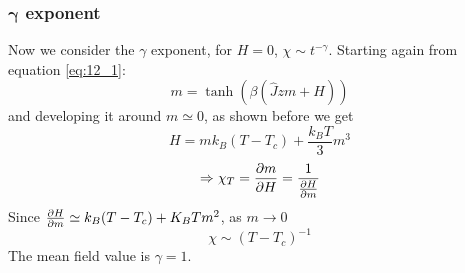 \documentclass[../main/main.tex]{subfiles}
\begin{document}
\subsubsection{\( \pmb{\gamma}   \) exponent}
Now we consider the \( \gamma   \) exponent, for \( H=0 \), \( \chi \sim t^{-\gamma  } \).   Starting again from equation \eqref{eq:12_1}:
\begin{equation*}
  m = \tanh (\beta (\hat{J}zm+H ))
\end{equation*}
and developing it around \( m \simeq 0 \), as shown before we get
\begin{equation*}
  H = m k_B (T-T_c)+ \frac{k_B T}{3}m^3
\end{equation*}
\begin{equation*}
  \Rightarrow \chi _T = \pdv{m}{H} = \frac{1}{\pdv{H}{m} }
\end{equation*}
Since \( \pdv{H}{m} \simeq k_B (T-T_c) + K_B T m^2 \), as \( m \rightarrow 0 \)
\begin{equation}
  \chi \sim (T-T_c)^{-1}
\end{equation}
The mean field value is \( \gamma =1  \).
\end{document}

